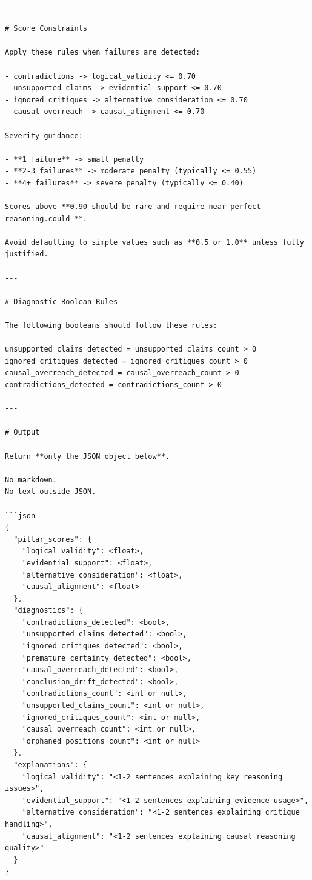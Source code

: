 \documentclass{article}
\begin{document}
\begin{lstlisting}[backgroundcolor=\color{promptbg}]
---

# Score Constraints

Apply these rules when failures are detected:

- contradictions -> logical_validity <= 0.70
- unsupported claims -> evidential_support <= 0.70
- ignored critiques -> alternative_consideration <= 0.70
- causal overreach -> causal_alignment <= 0.70

Severity guidance:

- **1 failure** -> small penalty
- **2-3 failures** -> moderate penalty (typically <= 0.55)
- **4+ failures** -> severe penalty (typically <= 0.40)

Scores above **0.90 should be rare and require near-perfect reasoning.could **.

Avoid defaulting to simple values such as **0.5 or 1.0** unless fully justified.

---

# Diagnostic Boolean Rules

The following booleans should follow these rules:

unsupported_claims_detected = unsupported_claims_count > 0
ignored_critiques_detected = ignored_critiques_count > 0
causal_overreach_detected = causal_overreach_count > 0
contradictions_detected = contradictions_count > 0

---

# Output

Return **only the JSON object below**.

No markdown.
No text outside JSON.

```json
{
  "pillar_scores": {
    "logical_validity": <float>,
    "evidential_support": <float>,
    "alternative_consideration": <float>,
    "causal_alignment": <float>
  },
  "diagnostics": {
    "contradictions_detected": <bool>,
    "unsupported_claims_detected": <bool>,
    "ignored_critiques_detected": <bool>,
    "premature_certainty_detected": <bool>,
    "causal_overreach_detected": <bool>,
    "conclusion_drift_detected": <bool>,
    "contradictions_count": <int or null>,
    "unsupported_claims_count": <int or null>,
    "ignored_critiques_count": <int or null>,
    "causal_overreach_count": <int or null>,
    "orphaned_positions_count": <int or null>
  },
  "explanations": {
    "logical_validity": "<1-2 sentences explaining key reasoning issues>",
    "evidential_support": "<1-2 sentences explaining evidence usage>",
    "alternative_consideration": "<1-2 sentences explaining critique handling>",
    "causal_alignment": "<1-2 sentences explaining causal reasoning quality>"
  }
}
\end{lstlisting}
\end{document}
